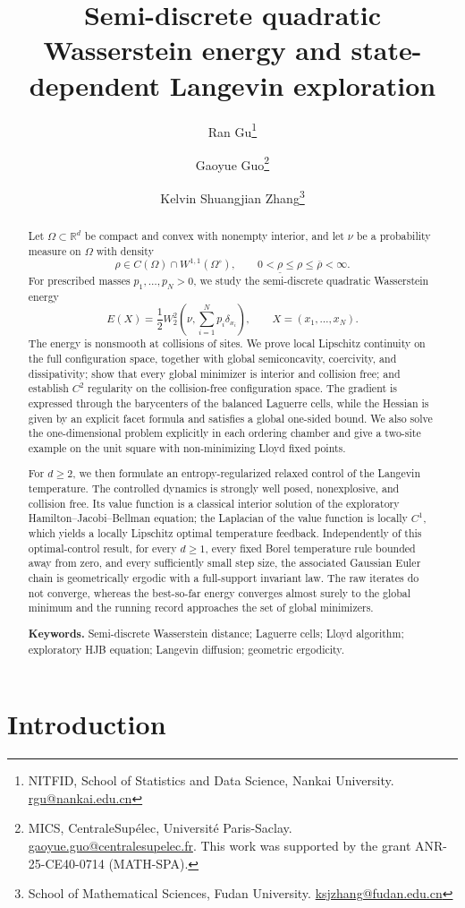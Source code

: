 \documentclass[11pt]{article}
\title{Semi-discrete quadratic Wasserstein energy and state-dependent Langevin exploration}
\author{%
  Ran Gu\thanks{NITFID, School of Statistics and Data Science,
  Nankai University. \href{mailto:rgu@nankai.edu.cn}{rgu@nankai.edu.cn}}
  \and
  Gaoyue Guo\thanks{MICS, CentraleSup\'elec, Universit\'e Paris-Saclay.
  \href{mailto:gaoyue.guo@centralesupelec.fr}{gaoyue.guo@centralesupelec.fr}. This work was supported by the grant ANR-25-CE40-0714 (MATH-SPA). }
  \and
  Kelvin Shuangjian Zhang\thanks{School of Mathematical Sciences,
  Fudan University. \href{mailto:ksjzhang@fudan.edu.cn}{ksjzhang@fudan.edu.cn}}
}
\date{}
\theoremstyle{definition}
\theoremstyle{remark}
\numberwithin{equation}{section}
\begin{document}
\maketitle


\begin{abstract}
Let $\Omega\subset\mathbb R^d$ be compact and convex with nonempty interior, and let $\nu$ be a
probability measure on $\Omega$ with density
\[
 \rho\in C(\Omega)\cap W^{1,1}(\Omega^\circ),
 \qquad
 0<\underline\rho\le\rho\le\overline\rho<\infty.
\]
For prescribed masses $p_1,\ldots,p_N>0$, we study the semi-discrete quadratic Wasserstein energy
\[
 E(X)=\frac12W_2^2\!\left(\nu,\sum_{i=1}^Np_i\delta_{x_i}\right),
 \qquad X=(x_1,\ldots,x_N).
\]
The energy is nonsmooth at collisions of sites.  We prove local Lipschitz continuity on the full
configuration space, together with global semiconcavity, coercivity, and dissipativity; show that every
global minimizer is interior and collision free; and establish $C^2$ regularity on the collision-free
configuration space.  The gradient is expressed through the barycenters of the balanced Laguerre
cells, while the Hessian is given by an explicit facet formula and satisfies a global one-sided bound.
We also solve the one-dimensional problem explicitly in each ordering chamber and give a two-site
example on the unit square with non-minimizing Lloyd fixed points.

For $d\ge2$, we then formulate an entropy-regularized relaxed control of the Langevin temperature.
The controlled dynamics is strongly well posed, nonexplosive, and collision free.  Its value function
is a classical interior solution of the exploratory Hamilton--Jacobi--Bellman equation; the Laplacian
of the value function is locally $C^1$, which yields a locally Lipschitz optimal temperature feedback.
Independently of this optimal-control result, for every $d\ge1$, every fixed Borel temperature rule
bounded away from zero, and every sufficiently small step size, the associated Gaussian Euler chain
is geometrically ergodic with a full-support invariant law.  The raw iterates do not converge, whereas
the best-so-far energy converges almost surely to the global minimum and the running record approaches
the set of global minimizers.

\medskip
\noindent\textbf{Keywords.}
Semi-discrete Wasserstein distance; Laguerre cells; Lloyd algorithm; exploratory HJB  equation; Langevin diffusion;
geometric ergodicity. 
\end{abstract}


\section{Introduction}\label{sec:intro}
\end{document}
